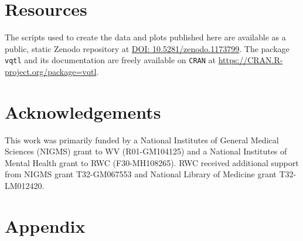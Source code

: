 \documentclass[9pt,twocolumn,twoside]{gsag3jnl}
\begin{document}
\section*{Resources}
The scripts used to create the data and plots published here are available as a public, static Zenodo repository at \url{DOI: 10.5281/zenodo.1173799}.
The package \texttt{vqtl} and its documentation are freely available on \texttt{CRAN} at \url{https://CRAN.R-project.org/package=vqtl}.


\section{Acknowledgements}
This work was primarily funded by a National Institutes of General Medical Sciences (NIGMS) grant to WV (R01-GM104125) and a National Institutes of Mental Health grant to RWC (F30-MH108265).
RWC received additional support from NIGMS grant T32-GM067553 and National Library of Medicine grant T32-LM012420.





\clearpage
\newpage
\section*{Appendix}

\setcounter{figure}{0}
\renewcommand{\thefigure}{A\arabic{figure}}
\end{document}
